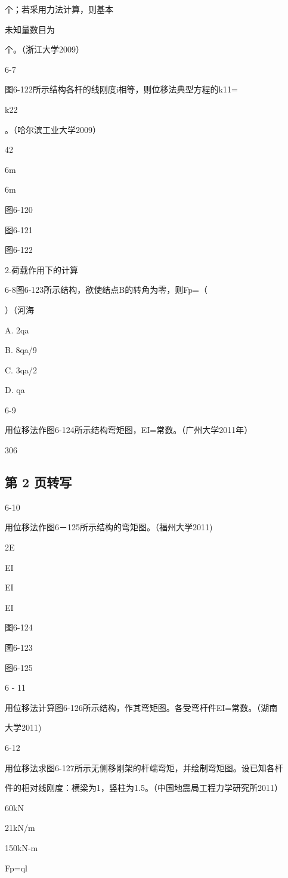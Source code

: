 个；若采用力法计算，则基本

未知量数目为

个。（浙江大学2009）

6-7

图6-122所示结构各杆的线刚度i相等，则位移法典型方程的k11=

k22

。（哈尔滨工业大学2009）

42

6m

6m

图6-120

图6-121

图6-122

2.荷载作用下的计算

6-8图6-123所示结构，欲使结点B的转角为零，则Fp=（

）（河海

A. 2qa

B. 8qa/9

C. 3qa/2

D. qa

6-9

用位移法作图6-124所示结构弯矩图，EI=常数。（广州大学2011年）

306

\subsection*{第 2 页转写}
6-10

用位移法作图6－125所示结构的弯矩图。（福州大学2011)

2E

EI

EI

EI

图6-124

图6-123

图6-125

6 - 11

用位移法计算图6-126所示结构，作其弯矩图。各受弯杆件EI=常数。（湖南

大学2011)

6-12

用位移法求图6-127所示无侧移刚架的杆端弯矩，并绘制弯矩图。设已知各杆

件的相对线刚度：横梁为1，竖柱为1.5。（中国地震局工程力学研究所2011）

60kN

21kN/m

150kN-m

Fp=ql

